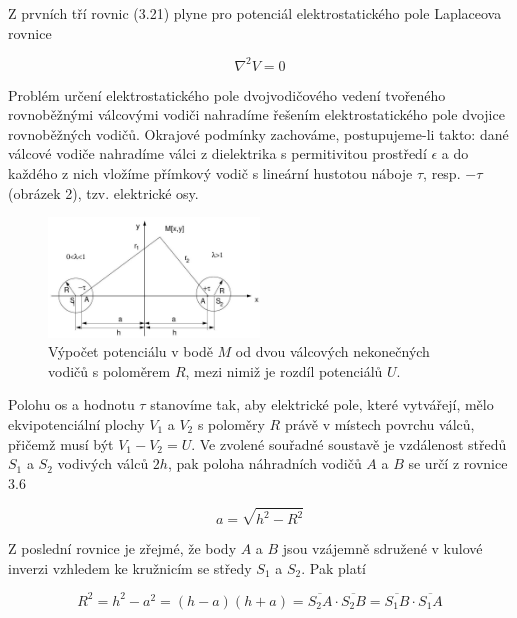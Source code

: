 \documentclass[czech,11pt,a4paper]{article}
\begin{document}
\begin{multicols}{2}
	
	Z prvních tří rovnic (3.21) plyne pro potenciál elektrostatického pole Laplaceova rovnice
	
	
	\begin{equation*}
		\nabla^{2} V=0 \tag{3.7}
	\end{equation*}
	
	
	Problém určení elektrostatického pole dvojvodičového vedení tvořeného rovnoběžnými válcovými vodiči nahradíme řešením elektrostatického pole dvojice rovnoběžných vodičů. Okrajové podmínky zachováme, postupujeme-li takto: dané válcové vodiče nahradíme válci z dielektrika s permitivitou prostředí $\epsilon$ a do každého z nich vložíme přímkový vodič s lineární hustotou náboje $\tau$, resp. $-\tau$ (obrázek 2), tzv. elektrické osy.\\
	\begin{figure}[H]
		\includegraphics[max width=0.5\textwidth, center]{2024_10_15_71c3161fc9161f95056eg-2}
		
		\caption{ Výpočet potenciálu v bodě $M$ od dvou válcových nekonečných vodičů s poloměrem $R$, mezi nimiž je rozdíl potenciálů $U$.}
	\end{figure}
	
	
	Polohu os a hodnotu $\tau$ stanovíme tak, aby elektrické pole, které vytvářejí, mělo ekvipotenciální plochy $V_{1}$ a $V_{2}$ s poloměry $R$ právě v místech povrchu válců, přičemž musí být $V_{1}-V_{2}=U$. Ve zvolené souřadné soustavě je vzdálenost středů $S_{1}$ a $S_{2}$ vodivých válců $2 h$, pak poloha náhradních vodičů $A$ a $B$ se určí z rovnice 3.6
	
	
	\begin{equation*}
		a=\sqrt{h^{2}-R^{2}} \tag{3.8}
	\end{equation*}
	
	
	Z poslední rovnice je zřejmé, že body $A$ a $B$ jsou vzájemně sdružené v kulové inverzi vzhledem ke kružnicím se středy $S_{1}$ a $S_{2}$. Pak platí
	
	{\small 
	\begin{equation*} 
		R^{2}=h^{2}-a^{2}=(h-a)(h+a)=\overline{S_{2} A} \cdot \overline{S_{2} B}=\overline{S_{1} B} \cdot \overline{S_{1} A} \tag{3.9}
	\end{equation*}}
	

\end{multicols}
\end{document}
